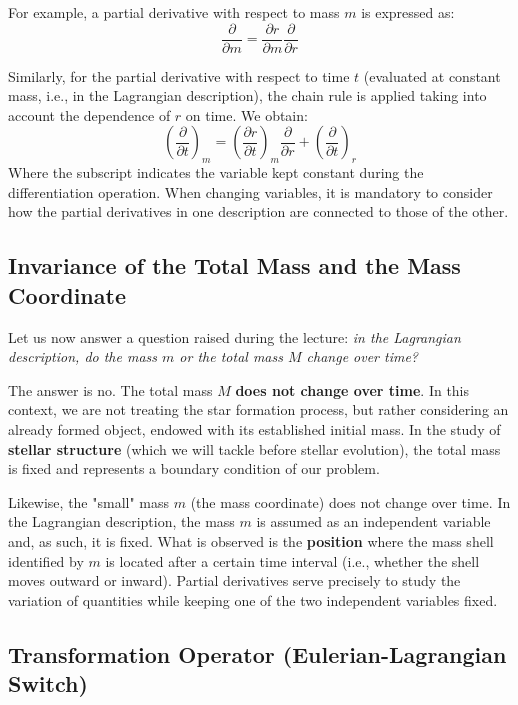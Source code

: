 For example, a partial derivative with respect to mass $m$ is expressed as:
\begin{equation}
\frac{\partial}{\partial m} = \frac{\partial r}{\partial m} \frac{\partial}{\partial r}
\end{equation}

Similarly, for the partial derivative with respect to time $t$ (evaluated at constant mass, i.e., in the Lagrangian description), the chain rule is applied taking into account the dependence of $r$ on time. We obtain:
\begin{equation}
\left( \frac{\partial}{\partial t} \right)_m = \left( \frac{\partial r}{\partial t} \right)_m \frac{\partial}{\partial r} + \left( \frac{\partial}{\partial t} \right)_r
\end{equation}
Where the subscript indicates the variable kept constant during the differentiation operation. When changing variables, it is mandatory to consider how the partial derivatives in one description are connected to those of the other.

\subsection{Invariance of the Total Mass and the Mass Coordinate}

Let us now answer a question raised during the lecture: \textit{in the Lagrangian description, do the mass $m$ or the total mass $M$ change over time?}

The answer is no. The total mass $M$ \textbf{does not change over time}. In this context, we are not treating the star formation process, but rather considering an already formed object, endowed with its established initial mass. In the study of \textbf{stellar structure} (which we will tackle before stellar evolution), the total mass is fixed and represents a boundary condition of our problem.

Likewise, the "small" mass $m$ (the mass coordinate) does not change over time. In the Lagrangian description, the mass $m$ is assumed as an independent variable and, as such, it is fixed. What is observed is the \textbf{position} where the mass shell identified by $m$ is located after a certain time interval (i.e., whether the shell moves outward or inward). Partial derivatives serve precisely to study the variation of quantities while keeping one of the two independent variables fixed.

\subsection{Transformation Operator (Eulerian-Lagrangian Switch)}

